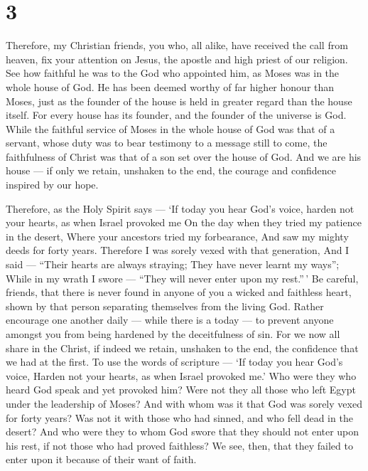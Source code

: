 \hypertarget{section-2}{%
\section{3}\label{section-2}}

 Therefore, my Christian friends, you who, all alike, have
received the call from heaven, fix your attention on Jesus, the apostle
and high priest of our religion.  See how faithful he was to
the God who appointed him, as Moses was in the whole house of God.
 He has been deemed worthy of far higher honour than Moses,
just as the founder of the house is held in greater regard than the
house itself.  For every house has its founder, and the
founder of the universe is God.  While the faithful service
of Moses in the whole house of God was that of a servant, whose duty was
to bear testimony to a message still to come,  the
faithfulness of Christ was that of a son set over the house of God. And
we are his house --- if only we retain, unshaken to the end, the courage
and confidence inspired by our hope.

 Therefore, as the Holy Spirit says --- `If today you hear
God's voice,  harden not your hearts, as when Israel
provoked me On the day when they tried my patience in the desert,
 Where your ancestors tried my forbearance, And saw my
mighty deeds for forty years.  Therefore I was sorely vexed
with that generation, And I said --- ``Their hearts are always straying;
They have never learnt my ways'';  While in my wrath I
swore --- ``They will never enter upon my rest.''\,'  Be
careful, friends, that there is never found in anyone of you a wicked
and faithless heart, shown by that person separating themselves from the
living God.  Rather encourage one another daily --- while
there is a today --- to prevent anyone amongst you from being hardened
by the deceitfulness of sin.  For we now all share in the
Christ, if indeed we retain, unshaken to the end, the confidence that we
had at the first.  To use the words of scripture --- `If
today you hear God's voice, Harden not your hearts, as when Israel
provoked me.'  Who were they who heard God speak and yet
provoked him? Were not they all those who left Egypt under the
leadership of Moses?  And with whom was it that God was
sorely vexed for forty years? Was not it with those who had sinned, and
who fell dead in the desert?  And who were they to whom God
swore that they should not enter upon his rest, if not those who had
proved faithless?  We see, then, that they failed to enter
upon it because of their want of faith.

